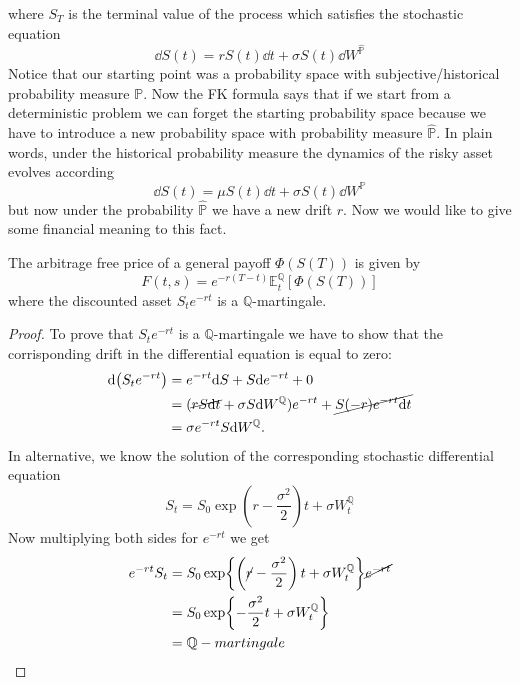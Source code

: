 where $S_T$ is the terminal value of the process which satisfies the stochastic equation
\begin{equation}
    \dd S(t) = rS(t)\dd t + \sigma S(t)\dd W^{\hat{\mathbb{P}}}
\end{equation}
Notice that our starting point was a probability space with subjective/historical probability measure $\mathbb{P}$. Now the FK formula says that if we start from a deterministic problem we can forget the starting probability space because we have to introduce a new probability space with probability measure $\hat{\mathbb{P}}$. In plain words, under the historical probability measure the dynamics of the risky asset evolves according 
\begin{equation}
    \dd S(t) =  \mu S(t)\dd t + \sigma S(t)\dd W^{\mathbb{P}}
\end{equation}
but now under the probability $\hat{\mathbb{P}}$ we have a new drift $r$. Now we would like to give some financial meaning to this fact.
\begin{proposition}
    The arbitrage free price of a general payoff $\Phi(S(T))$ is given by
    \begin{equation}\label{rnv}
        F(t,s) = e^{-r(T-t)}\mathbb{E}^{\mathbb{Q}}_t [\Phi(S(T))]
    \end{equation}
    where the discounted asset $S_te^{-rt}$ is a $\mathbb{Q}$-martingale.
\end{proposition}
\begin{proof}
    To prove that $S_te^{-rt}$ is a $\mathbb{Q}$-martingale we have to show that the corrisponding drift in the differential equation is equal to zero:
    \begin{align*}
        \dd(S_te^{-rt}) &= e^{-rt}\dd S + S\dd e^{-rt} + 0 \\
        &=
        (\cancel{rS\dd t} + \sigma S\dd W^{\mathbb{Q}})e^{-rt} + \cancel{S(-r)e^{-rt}\dd t} \\
        &=
        \sigma e^{-rt} S\dd W^{\mathbb{Q}}.
    \end{align*}
    In alternative, we know the solution of the corresponding stochastic differential equation
    \begin{equation*}
        S_t = S_0\exp{\left(r-\frac{\sigma^2}{2}\right)t + \sigma W_t^\mathbb{Q}}
    \end{equation*}
    Now multiplying both sides for $e^{-rt}$ we get
    \begin{align*}
        e^{-rt}S_t &= S_0\exp{\left(\cancel{r}-\frac{\sigma^2}{2}\right)t + \sigma W_t^\mathbb{Q}}\cancel{e^{-rt}} \\
        &=
        S_0\exp{-\frac{\sigma^2}{2}t + \sigma W_t^\mathbb{Q}} \\
        &= 
        \mathbb{Q}-martingale
    \end{align*}
\end{proof}
